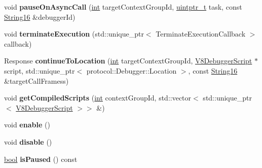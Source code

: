 \begin{DoxyCompactItemize}
\item 
\mbox{\label{classv8__inspector_1_1V8Debugger_a27ae88b52158024b1f0ce82ddd2e628e}} 
void {\bfseries pause\+On\+Async\+Call} (\mbox{\hyperlink{classint}{int}} target\+Context\+Group\+Id, \mbox{\hyperlink{classuintptr__t}{uintptr\+\_\+t}} task, const \mbox{\hyperlink{classv8__inspector_1_1String16}{String16}} \&debugger\+Id)
\item 
\mbox{\label{classv8__inspector_1_1V8Debugger_a70e0000b45a74c4d399c0c2d94a1fa27}} 
void {\bfseries terminate\+Execution} (std\+::unique\+\_\+ptr$<$ Terminate\+Execution\+Callback $>$ callback)
\item 
\mbox{\label{classv8__inspector_1_1V8Debugger_af7f8c0db48845b6dbdbef2a8456a75f6}} 
Response {\bfseries continue\+To\+Location} (\mbox{\hyperlink{classint}{int}} target\+Context\+Group\+Id, \mbox{\hyperlink{classv8__inspector_1_1V8DebuggerScript}{V8\+Debugger\+Script}} $\ast$script, std\+::unique\+\_\+ptr$<$ protocol\+::\+Debugger\+::\+Location $>$, const \mbox{\hyperlink{classv8__inspector_1_1String16}{String16}} \&target\+Call\+Framess)
\item 
\mbox{\label{classv8__inspector_1_1V8Debugger_af209a8817cd6a1b0b9c37a5b68a8a012}} 
void {\bfseries get\+Compiled\+Scripts} (\mbox{\hyperlink{classint}{int}} context\+Group\+Id, std\+::vector$<$ std\+::unique\+\_\+ptr$<$ \mbox{\hyperlink{classv8__inspector_1_1V8DebuggerScript}{V8\+Debugger\+Script}} $>$$>$ \&)
\item 
\mbox{\label{classv8__inspector_1_1V8Debugger_a2bfbda6982d76c582d41880ab5ec9297}} 
void {\bfseries enable} ()
\item 
\mbox{\label{classv8__inspector_1_1V8Debugger_a12856b4940ebdc9e71c5b9a4ec174fda}} 
void {\bfseries disable} ()
\item 
\mbox{\label{classv8__inspector_1_1V8Debugger_a4d7e23f90d899c39afef646ec0ad43ba}} 
\mbox{\hyperlink{classbool}{bool}} {\bfseries is\+Paused} () const
\item 
\mbox{\label{classv8__inspector_1_1V8Debugger_a1c68c30a79a5025f88c54486ad5e2381}} 
$$
\end{DoxyCompactItemize}
